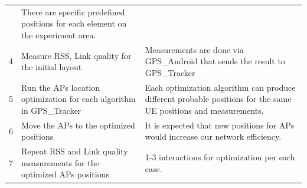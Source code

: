 \begin{longtable}[]{@{}lll@{}}
\begin{minipage}[t]{0.35\columnwidth}
\end{minipage} & \begin{minipage}[t]{0.55\columnwidth}\raggedright
There are specific predefined positions for each element on the
experiment area.\strut
\end{minipage}\tabularnewline
\begin{minipage}[t]{0.01\columnwidth}\raggedright
4\strut
\end{minipage} & \begin{minipage}[t]{0.35\columnwidth}\raggedright
Measure RSS, Link quality for the initial layout\strut
\end{minipage} & \begin{minipage}[t]{0.55\columnwidth}\raggedright
Measurements are done via GPS\_Android that sends the result to
GPS\_Tracker\strut
\end{minipage}\tabularnewline
\begin{minipage}[t]{0.01\columnwidth}\raggedright
5\strut
\end{minipage} & \begin{minipage}[t]{0.35\columnwidth}\raggedright
Run the APs location optimization for each algorithm in
GPS\_Tracker\strut
\end{minipage} & \begin{minipage}[t]{0.55\columnwidth}\raggedright
Each optimization algorithm can produce different probable positions for
the same UE positions and measurements.\strut
\end{minipage}\tabularnewline
\begin{minipage}[t]{0.01\columnwidth}\raggedright
6\strut
\end{minipage} & \begin{minipage}[t]{0.35\columnwidth}\raggedright
Move the APs to the optimized positions\strut
\end{minipage} & \begin{minipage}[t]{0.55\columnwidth}\raggedright
It is expected that new positions for APs would increase our network
efficiency.\strut
\end{minipage}\tabularnewline
\begin{minipage}[t]{0.01\columnwidth}\raggedright
7\strut
\end{minipage} & \begin{minipage}[t]{0.35\columnwidth}\raggedright
Repeat RSS and Link quality measurements for the optimized APs
positions\strut
\end{minipage} & \begin{minipage}[t]{0.55\columnwidth}\raggedright
1-3 interactions for optimization per each case.\strut
\end{minipage}\tabularnewline
\bottomrule
\end{longtable}
